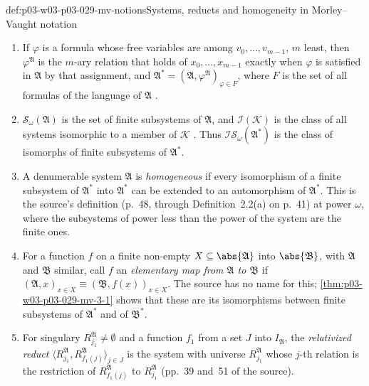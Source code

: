\begin{hbdefinition}{def:p03-w03-p03-029-mv-notions}{Systems, reducts and homogeneity in Morley--Vaught notation}
\begin{enumerate}
        B,a)_{a\in{}}\); it is the relation written
        \(\preccurlyeq\) elsewhere in this handbook. A class \(\mathscr N\)
        is an \emph{elementary type}, \(\mathscr N\in\mathbf{ET}\), if
        \(\mathscr N=\{\mathfrak B:\mathfrak B\equiv\mathfrak A\}\) for some
        infinite \(\mathfrak A\); then \(I_{\mathscr N}\) is the common index
        set \cite[p.~40]{MorleyVaught1962}.
  \item If \(\varphi\) is a formula whose free variables are among
        \(v_0,\ldots,v_{m-1}\), \(m\) least, then \(\varphi^{\mathfrak A}\)
        is the \(m\)-ary relation that holds of \(x_0,\ldots,x_{m-1}\)
        exactly when \(\varphi\) is satisfied in \(\mathfrak A\) by that
        assignment, and \(\mathfrak A^*=(\mathfrak
        A,\varphi^{\mathfrak A})_{\varphi\in F}\), where \(F\) is the set of
        all formulas of the language of \(\mathfrak A\)
        \cite[p.~47]{MorleyVaught1962}.
  \item \(\mathscr S_\omega(\mathfrak A)\) is the set of finite subsystems of
        \(\mathfrak A\), and \(\mathscr I(\mathscr K)\) is the class of all
        systems isomorphic to a member of \(\mathscr K\)
        \cite[p.~39]{MorleyVaught1962}. Thus \(\mathscr I\mathscr
        S_\omega(\mathfrak A^*)\) is the class of isomorphs of finite
        subsystems of \(\mathfrak A^*\).
  \item A denumerable system \(\mathfrak A\) is \emph{homogeneous} if every
        isomorphism of a finite subsystem of \(\mathfrak A^*\) into
        \(\mathfrak A^*\) can be extended to an automorphism of
        \(\mathfrak A^*\). This is the source's definition (p.~48, through
        Definition~2.2(a) on p.~41) at power \(\omega\), where the
        subsystems of power less than the power of the system are the finite
        ones.
  \item For a function \(f\) on a finite non-empty
        \(X\subseteq\abs{\mathfrak A}\) into \(\abs{\mathfrak B}\), with
        \(\mathfrak A\) and \(\mathfrak B\) similar, call \(f\) an
        \emph{elementary map from \(\mathfrak A\) to \(\mathfrak B\)} if
        \((\mathfrak A,x)_{x\in X}\equiv(\mathfrak B,f(x))_{x\in X}\). The
        source has no name for this; \cref{thm:p03-w03-p03-029-mv-3-1}
        shows that these are its isomorphisms between finite subsystems of
        \(\mathfrak A^*\) and of \(\mathfrak B^*\).
  \item For singulary \(R_{j_1}^{\mathfrak A}\neq\emptyset\) and a function
        \(f_1\) from a set \(J\) into \(I_{\mathfrak A}\), the
        \emph{relativized reduct} \(\langle R_{j_1}^{\mathfrak
        A},R_{f_1(j)}^{\mathfrak A}\rangle_{j\in J}\) is the system with
        universe \(R_{j_1}^{\mathfrak A}\) whose \(j\)-th relation is the
        restriction of \(R_{f_1(j)}^{\mathfrak A}\) to \(R_{j_1}^{\mathfrak
        A}\) (pp.~39 and~51 of the source).
\end{enumerate}
\end{hbdefinition}

